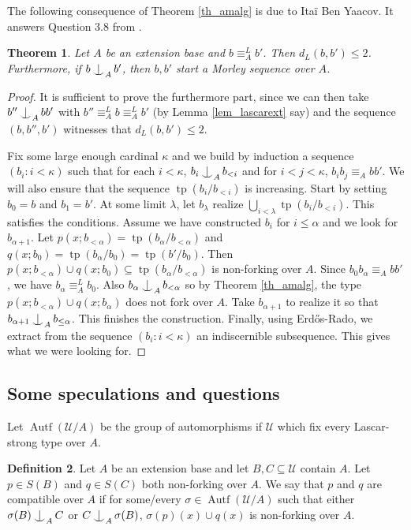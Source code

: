 \documentclass{amsart}
\makeatletter
\numberwithin{equation}{section}
\newtheorem{thm}{Theorem}[section]
\theoremstyle{definition}
\newtheorem{defi}[thm]{Definition}
\theoremstyle{mystyle}
\theoremstyle{remark}
\newcommand{\monster}{\mathcal U}
\DeclareMathOperator{\tp}{tp}
\DeclareMathOperator{\Autf}{Autf}
\def\indsym#1#2{%
 \setbox0=\hbox{$\m@th#1x$}%
 \kern\wd0%
 \hbox to 0pt{\hss$\m@th#1\mid$\hbox to 0pt{$\m@th#1^{#2}$\hss}\hss}%
 \lower.9\ht0\hbox to 0pt{\hss$\m@th#1\smile$\hss}%
 \kern\wd0}
\newcommand{\ind}[1][]{\mathop{\mathpalette\indsym{#1}}}
\makeatother
\begin{document}
The following consequence of Theorem \ref{th_amalg} is due to Ita\"i Ben Yaacov. It answers Question 3.8 from \cite{CherBY}.

\begin{thm}\label{th_Lascar}
Let $A$ be an extension base and $b\equiv_A ^ L b'$. Then $d_L(b,b')\leq 2$. Furthermore, if $b\ind_A b'$, then $b,b'$ start a Morley sequence over $A$.
\end{thm}
\begin{proof}
It is sufficient to prove the furthermore part, since we can then take $b''\ind_A bb'$ with $b''\equiv_A ^ L b \equiv_A^ L b'$ (by Lemma \ref{lem_lascarext} say) and the sequence $(b,b'',b')$ witnesses that $d_L(b,b')\leq 2$.

Fix some large enough cardinal $\kappa$ and we build by induction a sequence $(b_i:i<\kappa)$ such that for each $i<\kappa$, $b_i\ind_A b_{<i}$ and for $i<j<\kappa$, $b_ib_j\equiv_A bb'$. We will also ensure that the sequence $\tp(b_i/b_{<i})$ is increasing. Start by setting $b_0=b$ and $b_1=b'$. At some limit $\lambda$, let $b_\lambda$ realize $\bigcup_{i<\lambda} \tp(b_i/b_{<i})$. This satisfies the conditions. Assume we have constructed $b_i$ for $i\leq \alpha$ and we look for $b_{\alpha+1}$. Let $p(x;b_{<\alpha})=\tp(b_\alpha/b_{<\alpha})$ and $q(x;b_0)=\tp(b_\alpha/b_0)=\tp(b'/b_0)$. Then $p(x;b_{<\alpha})\cup q(x;b_0)\subseteq \tp(b_\alpha/b_{<\alpha})$ is non-forking over $A$. Since $b_0b_\alpha \equiv_A bb'$, we have $b_\alpha \equiv^ L_A b_0$. Also $b_\alpha \ind_A b_{<\alpha}$ so by Theorem \ref{th_amalg}, the type $p(x;b_{<\alpha})\cup q(x;b_\alpha)$ does not fork over $A$. Take $b_{\alpha+1}$ to realize it so that $b_{\alpha+1}\ind_A b_{\leq \alpha}$. This finishes the construction. Finally, using Erd\H os-Rado, we extract from the sequence $(b_i:i<\kappa)$ an indiscernible subsequence. This gives what we were looking for.
\end{proof}

\subsection{Some speculations and questions}

Let $\Autf(\monster/A)$ be the group of automorphisms if $\monster$ which fix every Lascar-strong type over $A$.

\begin{defi}
Let $A$ be an extension base and let $B,C\subseteq \monster$ contain $A$. Let $p\in S(B)$ and $q\in S(C)$ both non-forking over $A$. We say that $p$ and $q$ are compatible over $A$ if for some/every $\sigma \in \Autf(\monster/A)$ such that either $\sigma(B) \ind_A C$ or $C\ind_A \sigma(B)$, $\sigma(p)(x)\cup q(x)$ is non-forking over $A$.
\end{defi}
\end{document}
